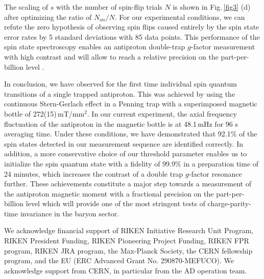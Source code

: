\documentclass[preprint%
]{elsarticle}
\begin{document}
The scaling of $s$ with the number of spin-flip trials $N$ is shown in Fig.$\,$\ref{fig3} (d) after optimizing the ratio of $N_{on}/N$. For our experimental conditions, we can refute the zero hypothesis of observing spin flips caused entirely by the spin state error rates by 5 standard deviations with 85 data points. This performance of the spin state spectroscopy enables an antiproton double-trap $g$-factor measurement with high contrast and will allow to reach a relative precision on the part-per-billion level \cite{MooserNature2014}.


In conclusion, we have observed for the first time individual spin quantum transitions of a single trapped antiproton. This was achieved by using the continuous Stern-Gerlach effect in a Penning trap with a superimposed magnetic bottle of 272(15)$\,$mT/mm$^2$. In our current experiment, the axial frequency fluctuation of the antiproton in the magnetic bottle is at 48.1$\,$mHz for 96 s averaging time. Under these conditions, we have demonstrated that 92.1$\%$ of the spin states detected in our measurement sequence are identified correctly. In addition, a more conservative choice of our threshold parameter enables us to initialize the spin quantum state with a fidelity of 99.9$\%$ in a preparation time of 24 minutes, which increases the contrast of a double trap $g$-factor resonance further. These achievements constitute a major step towards a measurement of the antiproton magnetic moment with a fractional precision on the part-per-billion level which will provide one of the most stringent tests of charge-parity-time invariance in the baryon sector. 

We acknowledge financial support of RIKEN Initiative Research Unit Program, RIKEN President Funding, RIKEN Pioneering Project Funding, RIKEN FPR program, RIKEN JRA program, the Max-Planck Society, the CERN fellowship program, and the EU (ERC Advanced Grant No. 290870-MEFUCO). We acknowledge support from CERN, in particular from the AD operation team.  
\end{document}
